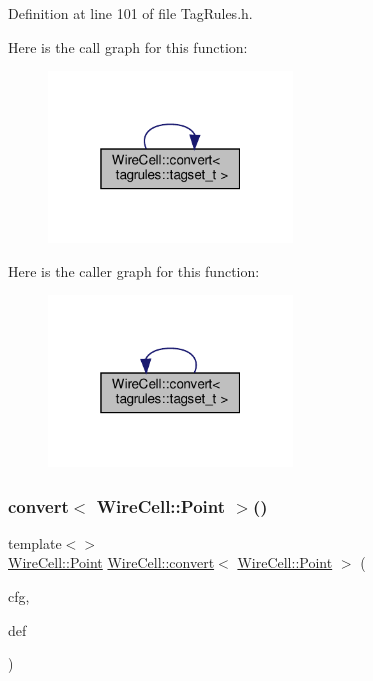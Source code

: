 Definition at line 101 of file Tag\+Rules.\+h.

Here is the call graph for this function\+:
\nopagebreak
\begin{figure}[H]
\begin{center}
\leavevmode
\includegraphics[width=184pt]{namespace_wire_cell_a02c87570501f0be739835ce24816d926_cgraph}
\end{center}
\end{figure}
Here is the caller graph for this function\+:
\nopagebreak
\begin{figure}[H]
\begin{center}
\leavevmode
\includegraphics[width=184pt]{namespace_wire_cell_a02c87570501f0be739835ce24816d926_icgraph}
\end{center}
\end{figure}
\mbox{\label{namespace_wire_cell_a936eba17fa684570591e0ed12dc4219a}} 
\subsubsection{\texorpdfstring{convert$<$ Wire\+Cell\+::\+Point $>$()}{convert< WireCell::Point >()}}
{\footnotesize\ttfamily template$<$$>$ \\
\hyperlink{namespace_wire_cell_ab2b2565fa6432efbb4513c14c988cda9}{Wire\+Cell\+::\+Point} \hyperlink{namespace_wire_cell_a5f6648d6ae801b20a17b8a35fd3306e5}{Wire\+Cell\+::convert}$<$ \hyperlink{namespace_wire_cell_ab2b2565fa6432efbb4513c14c988cda9}{Wire\+Cell\+::\+Point} $>$ (\begin{DoxyParamCaption}\item[{const \hyperlink{namespace_wire_cell_a9f705541fc1d46c608b3d32c182333ee}{Configuration} \&}]{cfg,  }\item[{const \hyperlink{namespace_wire_cell_ab2b2565fa6432efbb4513c14c988cda9}{Wire\+Cell\+::\+Point} \&}]{def }\end{DoxyParamCaption})\hspace{0.3cm}{\ttfamily [inline]}}



